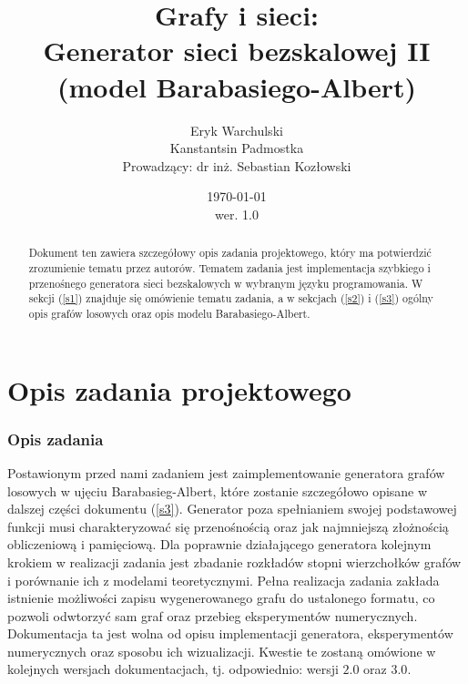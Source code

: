 \documentclass{article}
\title{Grafy i sieci: \\ Generator sieci bezskalowej II (model Barabasiego-Albert)}
\author{Eryk Warchulski \\ Kanstantsin Padmostka \\ Prowadzący: dr inż. Sebastian Kozłowski}%
\date{\today\\wer. 1.0}
\def\lecturemark{}
\newcommand{\spr}[1]{\part{#1}\def\lecturemark{\partname\ \thepart: #1}}
\renewcommand{\partname}{Sprawozdanie}
\renewcommand{\thepart}{\arabic{part}}
\begin{document}
\maketitle
{\footnotesize{\tableofcontents}}
\vspace{2cm}
\begin{abstract}
	Dokument ten zawiera szczegółowy opis zadania projektowego, który ma potwierdzić zrozumienie tematu przez autorów.
	Tematem zadania jest implementacja szybkiego i przenośnego generatora
	sieci bezskalowych w wybranym języku programowania. 
	W sekcji (\ref{s1}) znajduje się omówienie tematu zadania, a w sekcjach (\ref{s2}) i  
	(\ref{s3}) ogólny opis grafów losowych oraz opis modelu Barabasiego-Albert. 
\end{abstract}
\newpage
\spr{Opis zadania projektowego}
\section{Opis zadania \label{s1}}
	Postawionym przed nami zadaniem jest zaimplementowanie generatora grafów losowych w ujęciu Barabasieg-Albert, które zostanie szczegółowo
	opisane w dalszej części dokumentu (\ref{s3}). Generator poza spełnianiem swojej podstawowej funkcji musi charakteryzować się
	przenośnością oraz jak najmniejszą złożnością obliczeniową i pamięciową. Dla poprawnie działającego generatora kolejnym krokiem w realizacji
	zadania jest zbadanie rozkładów stopni wierzchołków grafów i porównanie ich z modelami teoretycznymi. Pełna realizacja zadania zakłada istnienie
	możliwości zapisu wygenerowanego grafu do ustalonego formatu, co pozwoli odwtorzyć sam graf oraz przebieg eksperymentów numerycznych.\\
	Dokumentacja ta jest wolna od opisu implementacji generatora, eksperymentów numerycznych oraz sposobu ich wizualizacji. Kwestie te zostaną
	omówione w kolejnych wersjach dokumentacjach, tj. odpowiednio: wersji $2.0$ oraz $3.0$. 
\end{document}
